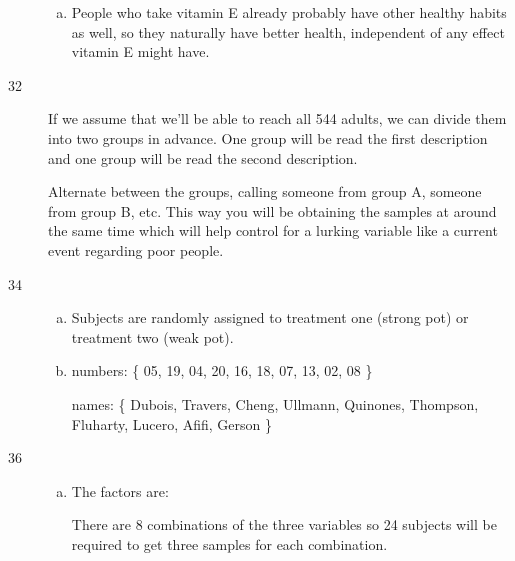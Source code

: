 \documentclass[letterpaper]{exam}
\begin{document}
\begin{description}
\begin{enumerate}[(a)]
          \item People who take vitamin E already probably have other healthy
            habits as well, so they naturally have better health, independent of
            any effect vitamin E might have.
        \end{enumerate}

      \item[32] If we assume that we'll be able to reach all 544 adults, we can
        divide them into two groups in advance.  One group will be read the
        first description and one group will be read the second description.

        Alternate between the groups, calling someone from group A, someone from
        group B, etc. This way you will be obtaining the samples at around the
        same time which will help control for a lurking variable like a current
        event regarding poor people.
        
      \item[34]
        \begin{enumerate}[(a)]
          \item Subjects are randomly assigned to treatment one (strong pot) or
            treatment two (weak pot).

          \item numbers: \{ 05, 19, 04, 20, 16, 18, 07, 13, 02, 08 \}

            names: \{ Dubois, Travers, Cheng, Ullmann, Quinones, Thompson, Fluharty,
            Lucero, Afifi, Gerson \}

        \end{enumerate}

      \item[36]
        \begin{enumerate}[(a)]
          \item The factors are:

           There are 8 combinations of the three variables so 24 subjects
           will be required to get three samples for each combination.


\end{enumerate}
\end{description}
\end{document}
